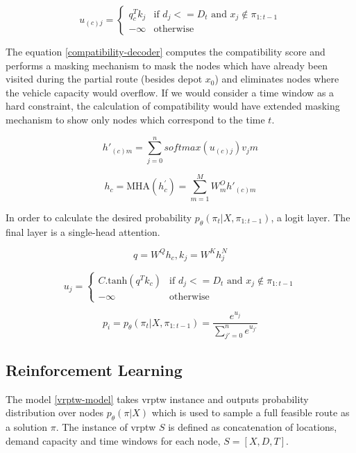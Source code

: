     \begin{equation}\label{compatibility-decoder}
        u_{(c)j} = \begin{cases} q_c^T k_j &\mbox{if }  d_j <= D_t \text{ and } x_j \notin \pi_{1:t-1} \\ -\infty &\mbox{otherwise} \end{cases}
    \end{equation}
    
    The equation \ref{compatibility-decoder} computes the compatibility score and performs a masking mechanism to mask the nodes which have already been visited during the partial route (besides depot $x_0$) and eliminates nodes where the vehicle capacity would overflow. If we would consider a time window as a hard constraint, the calculation of compatibility would have extended masking mechanism to show only nodes which correspond to the time $t$.
    
    \begin{equation}
        h'_{(c)m} = \sum_{j=0}^n softmax(u_{(c)j}) v_jm
    \end{equation}
        
    \begin{equation}
        h_{c} = \text{MHA}(h_{c}^{'}) = \sum_{m=1}^M W_{m}^O h'_{(c)m}
    \end{equation}
    
    In order to calculate the desired probability $p_{\theta}(\pi_t|X, \pi_{1:t-1})$, a logit layer. The final layer is a single-head attention.
    
    \begin{equation}
        q = W^Q h_c, k_j = W^K h_j^N
    \end{equation}
    
    \begin{equation}
        u_j = \begin{cases} C . \text{tanh}(q^T k_{c}) &\mbox{if }  d_j <= D_t \text{ and } x_j \notin \pi_{1:t-1} \\ -\infty &\mbox{otherwise} \end{cases}
    \end{equation}
    
    \begin{equation}\label{encoder-attention-score}
        p_i = p_{\theta}(\pi_t|X, \pi_{1:t-1}) = \dfrac{e^{u_j}}{\sum_{j'=0}^n e^{u_{j'}}}
    \end{equation}
    
    \subsection{Reinforcement Learning}\label{vrptw-rl}
    The model \ref{vrptw-model} takes \gls{vrptw} instance and outputs probability distribution over nodes $p_{\theta}(\pi|X)$ which is used to sample a full feasible route as a solution $\pi$. The instance of \gls{vrptw} $S$ is defined as concatenation of locations, demand capacity and time windows for each node, $S = [X, D, T]$.
    
